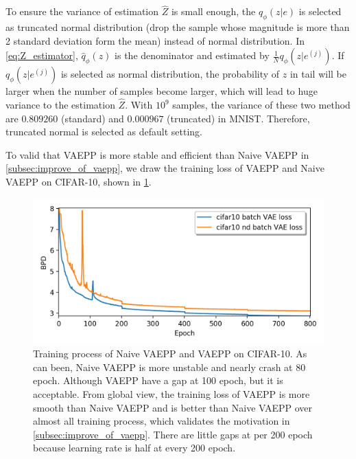 To ensure the variance of estimation $\hat{Z}$ is small enough, the $q_\phi(z|e)$ is selected as truncated normal distribution (drop the sample whose magnitude is more than 2 standard deviation form the mean) instead of normal distribution. In \cref{eq:Z_estimator}, $\hat{q}_\phi(z)$ is the denominator and estimated by $\frac{1}{N}q_\phi(z|e^{(j)})$. If $q_\phi(z|e^{(j)})$ is selected as normal distribution, the probability of $z$ in tail will be larger when the number of samples become larger, which will lead to huge variance to the estimation $\hat{Z}$. With $10^9$ samples, the variance of these two method are $0.809260$ (standard) and $0.000967$ (truncated) in MNIST. Therefore, truncated normal is selected as default setting. 

To valid that VAEPP is more stable and efficient than Naive VAEPP in \cref{subsec:improve_of_vaepp}, we draw the training loss of VAEPP and Naive VAEPP on CIFAR-10, shown in \cref{fig:loss_curves}.
\begin{figure}
	\centering
	\includegraphics[width=1.0\columnwidth]{../figures/loss_curves.png}
	\caption{
	Training process of Naive VAEPP and VAEPP on CIFAR-10. As can been, Naive VAEPP is more unstable and nearly crash at 80 epoch. Although VAEPP have a gap at 100 epoch, but it is acceptable. From global view, the training loss of VAEPP is more smooth than Naive VAEPP and is better than Naive VAEPP over almost all training process, which validates the motivation in \cref{subsec:improve_of_vaepp}. There are little gaps at per 200 epoch because learning rate is half at every 200 epoch. 
	}
	\label{fig:loss_curves}
\end{figure}

